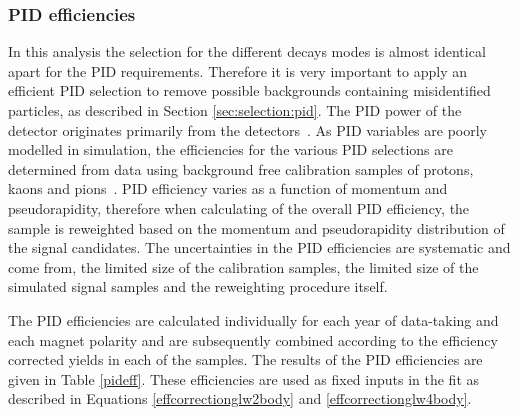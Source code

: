 \begin{table}[h]
\centering
{}
\caption{Summary of the BDT efficiencies used in the \CP fit.}
\label{bdteff}
\end{table}


\subsubsection{PID efficiencies}
\label{sec:cpfit:efficiencies:pid}

In this analysis the selection for the different \Dz decays modes is almost identical apart for the PID requirements. Therefore it is very important to apply an efficient PID selection to remove possible backgrounds containing misidentified particles, as described in Section \ref{sec:selection:pid}. The PID power of the detector originates primarily from the \rich detectors~\cite{LHCb-DP-2012-003,richrun2}. As PID variables are poorly modelled in \lhcb simulation, the efficiencies for the various PID selections are determined from data using background free calibration samples of protons, kaons and pions~\cite{LHCb-PUB-2016-021,LHCb-PUB-2016-005}. PID efficiency varies as a function of momentum and pseudorapidity, therefore when calculating of the overall PID efficiency, the sample is reweighted based on the momentum and pseudorapidity distribution of the signal candidates. The uncertainties in the PID efficiencies are systematic and come from, the limited size of the calibration samples, the limited size of the simulated signal samples and the reweighting procedure itself.

The PID efficiencies are calculated individually for each year of data-taking and each magnet polarity and are subsequently combined according to the efficiency corrected yields in each of the samples. The results of the PID efficiencies are given in Table \ref{pideff}. These efficiencies are used as fixed inputs in the \CP fit as described in Equations \ref{effcorrectionglw2body} and \ref{effcorrectionglw4body}. 

